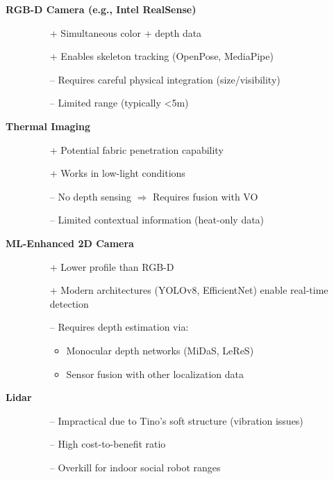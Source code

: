 \begin{description}
\item[\textbf{RGB-D Camera (e.g., Intel RealSense)}]
\hfill
\begin{itemize}[leftmargin=*,nosep]
    \item[+] Simultaneous color + depth data
    \item[+] Enables skeleton tracking (OpenPose, MediaPipe)
    \item[--] Requires careful physical integration (size/visibility)
    \item[--] Limited range (typically <5m)
\end{itemize}

\item[\textbf{Thermal Imaging}]
\hfill
\begin{itemize}[leftmargin=*,nosep]
    \item[+] Potential fabric penetration capability
    \item[+] Works in low-light conditions
    \item[--] No depth sensing $\Rightarrow$ Requires fusion with VO
    \item[--] Limited contextual information (heat-only data)
\end{itemize}

\item[\textbf{ML-Enhanced 2D Camera}]
\hfill
\begin{itemize}[leftmargin=*,nosep]
    \item[+] Lower profile than RGB-D
    \item[+] Modern architectures (YOLOv8, EfficientNet) enable real-time detection
    \item[--] Requires depth estimation via:
    \begin{itemize}
        \item Monocular depth networks (MiDaS, LeReS)
        \item Sensor fusion with other localization data
    \end{itemize}
\end{itemize}

\item[\textbf{Lidar}]
\hfill
\begin{itemize}[leftmargin=*,nosep]
    \item[--] Impractical due to Tino's soft structure (vibration issues)
    \item[--] High cost-to-benefit ratio
    \item[--] Overkill for indoor social robot ranges
\end{itemize}
\end{description}

